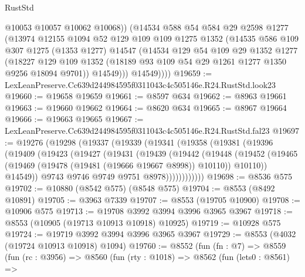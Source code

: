 \begin{lexlean}{RustStd}
\begin{coremodule}
              @10053
              @10057
              @10062
              @10068))
          (@14534
            @588
            @54
            @584
            @29
            @2598
            @1277
            (@13974
              @12155
              @1094
              @52
              @129
              @109
              @109
              @1275
              @1352
              (@14535
                @586
                @109
                @307
                @1275
                (@1353 @1277)
                @14547
                (@14534
                  @129
                  @54
                  @109
                  @29
                  @1352
                  @1277
                  (@18227
                    @129
                    @109
                    @1352
                    (@18189 @93 @109 @54 @29 @1261 @1277 @1350 @9256 @18094 @9701))
                  @14549)))
            @14549))))
@19659 := LexLeanPreserve.Cc639d244984595f0311043c4c505146e.R24.RustStd.look23
@19660 := @19658 @19659
@19661 := @8597 @634
@19662 := @8963 @19661
@19663 := @19660 @19662
@19664 := @8620 @634
@19665 := @8967 @19664
@19666 := @19663 @19665
@19667 := LexLeanPreserve.Cc639d244984595f0311043c4c505146e.R24.RustStd.fal23
@19697 := @19276
    (@19298
      (@19337
        (@19339
          (@19341
            (@19358
              (@19381
                (@19396
                  (@19409
                    (@19423
                      (@19427
                        (@19431
                          (@19439
                            (@19442
                              (@19448
                                (@19452
                                  (@19465
                                    (@19469 (@19478 (@19481 (@19666 @19667 @8998)) @10110))
                                    @10110))
                                @14549))
                            @9743
                            @9746
                            @9749
                            @9751
                            @8978))))))))))))
@19698 := @8536 @575
@19702 := @10880 (@8542 @575) (@8548 @575)
@19704 := @8553 (@8492 @10891)
@19705 := @3963 @7339
@19707 := @8553 (@19705 @10900)
@19708 := @10906 @575
@19713 := @19708 @3992 @3994 @3996 @3965 @3967
@19718 := @8553 (@10905 (@19713 @10913 @10918) @10925)
@19719 := @10928 @575
@19724 := @19719 @3992 @3994 @3996 @3965 @3967
@19729 := @8553 (@4032 (@19724 @10913 @10918) @1094)
@19760 := @8552
    (fun (fn : @7) =>
    @8559
      (fun (rc : @3956) =>
      @8560
        (fun (rty : @1018) =>
        @8562
          (fun (lets0 : @8561) =>

\end{coremodule}
\end{lexlean}
